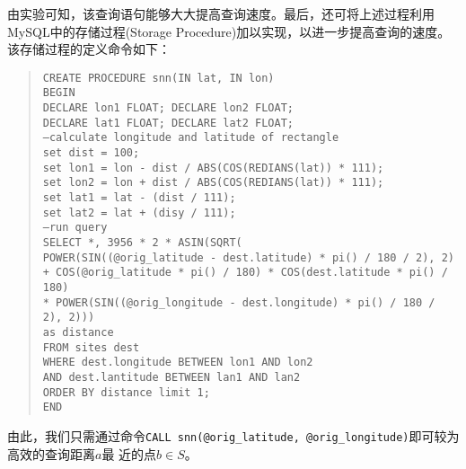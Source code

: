 由实验可知，该查询语句能够大大提高查询速度。最后，还可将上述过程利用MySQL中的存储过程(Storage
Procedure)加以实现，以进一步提高查询的速度。该存储过程的定义命令如下：

\begin{quote}
  \texttt{CREATE PROCEDURE snn(IN lat, IN lon)\\
    BEGIN\\
    DECLARE lon1 FLOAT; DECLARE lon2 FLOAT;\\
    DECLARE lat1 FLOAT; DECLARE lat2 FLOAT;\\
    --calculate longitude and latitude of rectangle\\
    set dist = 100;\\
    set lon1 = lon - dist / ABS(COS(REDIANS(lat)) * 111);\\
    set lon2 = lon + dist / ABS(COS(REDIANS(lat)) * 111);\\
    set lat1 = lat - (dist / 111);\\
    set lat2 = lat + (disy / 111);\\
    --run query\\
    SELECT *, 3956 * 2 * ASIN(SQRT(\\
    POWER(SIN((@orig\_latitude - dest.latitude) * pi() / 180 / 2), 2)\\
    + COS(@orig\_latitude * pi() / 180) * COS(dest.latitude * pi() / 180)\\
    * POWER(SIN((@orig\_longitude - dest.longitude) * pi() / 180 / 2), 2)))\\
    as distance\\
    FROM sites dest\\
    WHERE dest.longitude BETWEEN lon1 AND lon2\\
    AND dest.lantitude BETWEEN lan1 AND lan2\\
    ORDER BY distance limit 1;\\
    END} 
\end{quote}

由此，我们只需通过命令\texttt{CALL snn(@orig\_latitude, @orig\_longitude)}即可较为高效的查询距离$a$最
近的点$b\in S$。


